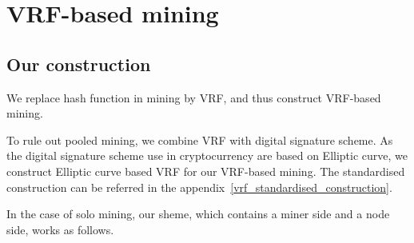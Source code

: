 \section{VRF-based mining}

\subsection{Our construction}

We replace hash function in mining by VRF, and thus construct VRF-based mining.

To rule out pooled mining, we combine VRF with digital signature scheme.
As the digital signature scheme use in cryptocurrency are based on Elliptic curve, we construct Elliptic curve based VRF for our VRF-based mining.
The standardised construction can be referred in the appendix~\ref{vrf_standardised_construction}.


In the case of solo mining, our sheme, which contains a miner side and a node side, works as follows.

